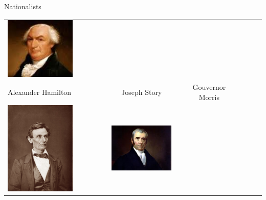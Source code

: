 \begin{frame}{Nationalists}
\begin{table}[h]
\begin{tabular}{lcccccc}
    \includegraphics[width=0.75\textwidth,height=.3\textheight,keepaspectratio=true]{img/morris-portrait.png} \\
    Alexander Hamilton & 
    Joseph Story &
    Gouvernor Morris \\
    \includegraphics[width=0.75\textwidth,height=.3\textheight,keepaspectratio=true]{img/lincoln-portrait.png} &
    \includegraphics[width=0.75\textwidth,height=.3\textheight,keepaspectratio=true]{img/marshall-portrait.png} &

\end{tabular}
\end{table}
\end{frame}
